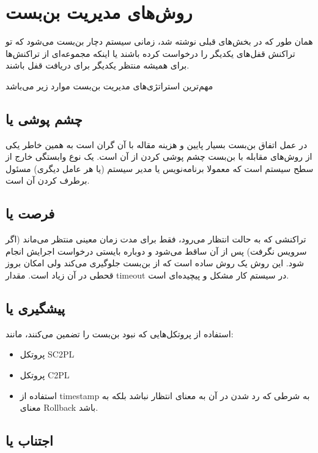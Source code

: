 \section{روش‌های مدیریت بن‌بست}

همان طور که در بخش‌های قبلی نوشته شد، زمانی سیستم دچار بن‌بست می‌شود که تو
تراکنش قفل‌های یکدیگر را درخواست کرده باشند یا اینکه مجموعه‌ای از تراکنش‌ها برای
همیشه منتظر یکدیگر برای دریافت قفل باشند.

مهم‌ترین استراتژی‌های مدیریت بن‌بست موارد زیر می‌باشد

\subsection{چشم پوشی یا }

در عمل اتفاق بن‌بست بسیار پایین و هزینه مقاله با آن گران است به همین خاطر یکی از
روش‌های مقابله با بن‌بست چشم پوشی کردن از آن است.  یک نوع وابستگی خارج از سطح
سیستم است که معمولا برنامه‌نویس یا مدیر سیستم (یا هر عامل دیگری) مسئول برطرف
کردن آن است.

\subsection{فرصت یا }

تراکنشی که به حالت انتظار می‌رود، فقط برای مدت زمان معینی منتظر می‌ماند (اگر
سرویس نگرفت) پس از آن ساقط می‌شود و دوباره بایستی درخواست اجرایش انجام شود. این
روش یک روش ساده است که از بن‌بست جلوگیری می‌کند ولی امکان بروز قحطی در آن زیاد
است. مقدار timeout در سیستم کار مشکل و پیچیده‌ای است.

\subsection{پیشگیری یا }

استفاده از پروتکل‌هایی که نبود بن‌بست را تضمین می‌کنند، مانند:

\begin{itemize}
    \item پروتکل SC2PL
    \item پروتکل C2PL
    \item استفاده از timestamp به شرطی که رد شدن در آن به معنای انتظار نباشد
    بلکه به معنای Rollback باشد.
\end{itemize}

\subsection{اجتناب یا }

